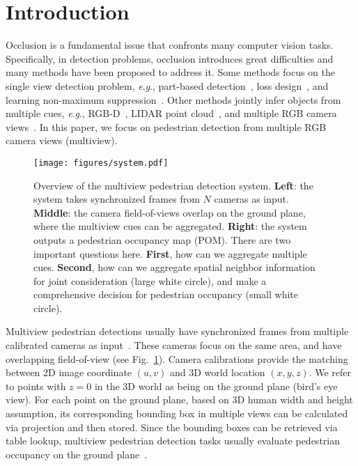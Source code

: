 \documentclass[runningheads]{llncs}
\newcommand{\eg}{\textit{e}.\textit{g}.}
\begin{document}
\section{Introduction}
\label{sec:intro}

Occlusion is a fundamental issue that confronts many computer vision tasks. Specifically, in detection problems, occlusion introduces great difficulties and many methods have been proposed to address it. Some methods focus on the single view detection problem, \eg, part-based detection~\cite{tian2015deep,ouyang2015partial,zhou2017multi}, loss design~\cite{zhang2018occlusion,wang2018repulsion}, and learning non-maximum suppression~\cite{hosang2017learning}. Other methods jointly infer objects from multiple cues, \eg, RGB-D~\cite{gupta2014learning,hoffman2016cross,qi2018frustum}, LIDAR point cloud~\cite{chen2017multi}, and multiple RGB camera views~\cite{fleuret2007multicamera,chavdarova2018wildtrack}. In this paper, we focus on pedestrian detection from multiple RGB camera views (multiview).



\begin{figure}[t]
    \centering
    \texttt{[image: figures/system.pdf]}
    \caption{Overview of the multiview pedestrian detection system. \textbf{Left}: the system takes synchronized frames from $N$ cameras as input. \textbf{Middle}: the camera field-of-views overlap on the ground plane, where the multiview cues can be aggregated. \textbf{Right}: the system outputs a pedestrian occupancy map (POM). There are two important questions here. \textbf{First}, how can we aggregate multiple cues. \textbf{Second}, how can we aggregate spatial neighbor information for joint consideration (large white circle), and make a comprehensive decision for pedestrian occupancy (small white circle). 
    }
    \label{fig:system}
\end{figure}


Multiview pedestrian detections usually have synchronized frames from multiple calibrated cameras as input~\cite{fleuret2007multicamera,roig2011conditional,chavdarova2018wildtrack}. These cameras focus on the same area, and have overlapping field-of-view (see Fig.~\ref{fig:system}). 
Camera calibrations provide the matching between 2D image coordinate $\left(u,v\right)$ and 3D world location $\left(x,y,z\right)$. We refer to points with $z=0$ in the 3D world as being on the ground plane (bird's eye view). For each point on the ground plane, based on 3D human width and height assumption, its corresponding bounding box in multiple views can be calculated via projection and then stored. Since the bounding boxes can be retrieved via table lookup, multiview pedestrian detection tasks usually evaluate pedestrian occupancy on the ground plane~\cite{fleuret2007multicamera,chavdarova2018wildtrack}. 
\end{document}
